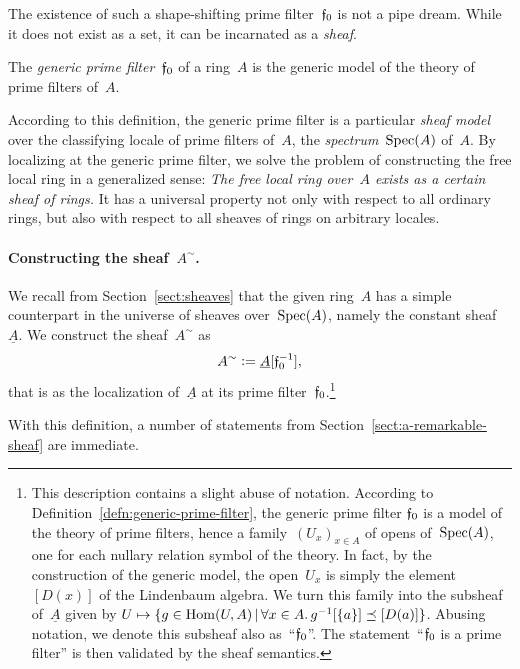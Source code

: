 \documentclass{ws-rv9x6}
\begin{document}
{The existence of such a shape-shifting prime filter~$\mathfrak{f}_0$ is not a pipe dream.
While it does not exist as a set, it can be incarnated as a \emph{sheaf}.

\begin{definition}\label{defn:generic-prime-filter}
The \emph{generic prime filter}~$\mathfrak{f}_0$ of a ring~$A$ is the
generic model of the theory of prime filters of~$A$.\end{definition}

According to this definition, the generic prime filter is a particular
\emph{sheaf model} over the classifying locale of prime filters of~$A$, the
\emph{spectrum}~$\mathrm{Spec}(A)$ of~$A$. By localizing at the generic prime filter, we solve
the problem of constructing the free local ring in a generalized sense: \emph{The
free local ring over~$A$ exists as a certain sheaf of rings.} It has a
universal property not only with respect to all ordinary rings, but also with respect to all
sheaves of rings on arbitrary locales.

\paragraph{Constructing the sheaf~$A^\sim$.} We recall from Section~\ref{sect:sheaves} that the given ring~$A$
has a simple counterpart in the universe of sheaves over~$\mathrm{Spec}(A)$, namely the
constant sheaf~$\underline{A}$. We construct the sheaf~$A^\sim$ as
\[ A^\sim \vcentcolon= \underline{A}[\mathfrak{f}_0^{-1}], \]
that is as the localization of~$\underline{A}$ at its prime
filter~$\mathfrak{f}_0$.\footnote{This description contains a slight abuse of notation.
According to Definition~\ref{defn:generic-prime-filter}, the generic prime
filter $\mathfrak{f}_0$ is a model of the theory of prime filters, hence a
family~$(U_x)_{x \in A}$ of opens of~$\mathrm{Spec}(A)$, one for each nullary relation
symbol of the theory. In fact, by the construction of the generic model, the
open~$U_x$ is simply the element~$[D(x)]$ of the Lindenbaum algebra. We
turn this family into the subsheaf of~$\underline{A}$ given by $U \mapsto \{ g
\in \mathrm{Hom}(U,A) \,|\, \forall x \in A\mathpunct{.} g^{-1}[\{a\}] \preceq [D(a)] \}$. Abusing
notation, we denote this subsheaf also as~``$\mathfrak{f}_0$''. The
statement~``$\mathfrak{f}_0$ is a prime filter'' is then validated by the sheaf semantics.}

With this definition, a number of statements from
Section~\ref{sect:a-remarkable-sheaf} are immediate.

}
\end{document}
